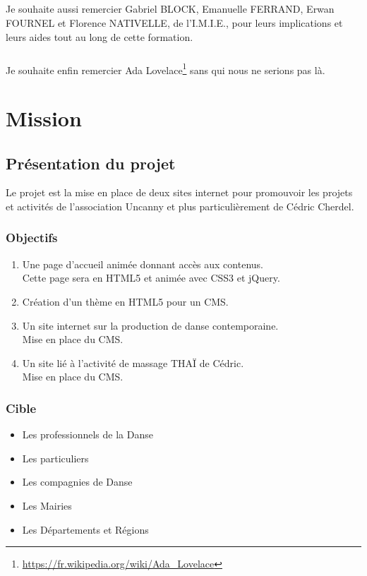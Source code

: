 \documentclass[11pt,a4paper]{report}
\begin{document}
		\paragraph*{}Je souhaite aussi remercier Gabriel BLOCK, Emanuelle FERRAND, Erwan FOURNEL et Florence \linebreak NATIVELLE, de l'I.M.I.E., pour leurs implications et leurs aides tout au long de cette formation.
		\paragraph*{}Je souhaite enfin remercier Ada Lovelace\footnote{\url{https://fr.wikipedia.org/wiki/Ada\_Lovelace}} sans qui nous ne serions pas là.

\chapter{Mission}
	\section{Présentation du projet}
		Le projet est la mise en place de deux sites internet pour promouvoir les projets et activités de l'association Uncanny et plus particulièrement de Cédric Cherdel. 
		\subsection{Objectifs}
			\begin{enumerate}
				\item Une page d'accueil animée donnant accès aux contenus.\\
				Cette page sera en HTML5 et animée avec CSS3 et jQuery.
				\item Création d'un thème en HTML5 pour un CMS.
				\item Un site internet sur la production de danse contemporaine.\\
				Mise en place du CMS.
				\item Un site lié à l'activité de massage THAÏ de Cédric.\\
				Mise en place du CMS.
			\end{enumerate}
		\subsection{Cible}
			\begin{itemize}
				\item Les professionnels de la Danse
				\item Les particuliers
				\item Les compagnies de Danse
				\item Les Mairies
				\item Les Départements et Régions
			\end{itemize}
\end{document}

